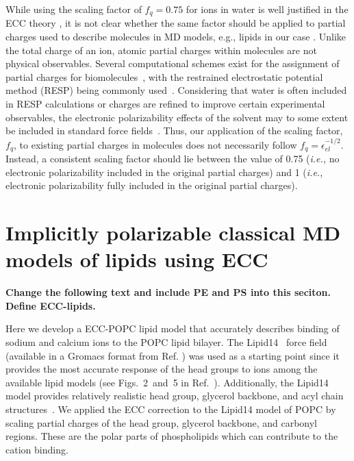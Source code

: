 While using the scaling factor of $f_q = 0.75$ for ions in water is well justified in the ECC theory \citep{leontyev11}, it is not clear whether the same factor should be applied to partial charges used to describe molecules in MD models, e.g., lipids in our case \citep{leontyev14}. Unlike the total charge of an ion, atomic partial charges within molecules are not physical observables. Several computational schemes exist for the assignment of partial charges for biomolecules~\citep{Hu2007}, with the restrained electrostatic potential method (RESP) being commonly used~\citep{RESP_paper, Singh1984}. Considering that water is often included in RESP calculations or charges are refined to improve certain experimental observables, the electronic polarizability effects of the solvent may to some extent be included in standard force fields~\citep{RESP_paper, Singh1984, jorgensen96, ipolq2013, benavides17}. Thus, our application of the scaling factor, $f_q$, to existing partial charges in molecules does not necessarily follow $f_q = \epsilon _{el} ^{-1/2}$. Instead, a consistent scaling factor should lie between the value of 0.75  (\textit{i.e.,} no electronic polarizability included in the original partial charges) and 1 (\textit{i.e.,} electronic polarizability fully included in the original partial charges).  
 



\section{Implicitly polarizable classical MD models of lipids using ECC}

\textbf{ Change the following text and include PE and PS into this seciton. 
         Define ECC-lipids. }

Here we develop a ECC-POPC lipid model that accurately describes binding  
of sodium and calcium ions to the POPC  lipid bilayer.  
The Lipid14~\citep{dickson14} force field  
(available in a Gromacs format from Ref. \citep{lipid14files}) was used as a starting  
point since  
it provides the most accurate response of the head groups to ions among the available  
lipid models (see Figs.~2~and~5 in Ref.~\citep{catte16}). Additionally, the Lipid14 model  
provides relatively realistic head group, glycerol backbone, and acyl chain structures~\citep{dickson14,botan15}. 
We applied the ECC correction  
to the Lipid14 model of POPC by scaling  
partial charges of the head group, glycerol  
backbone, and carbonyl regions.  
These are the polar parts of phospholipids which can  
contribute to the cation binding.  
 
